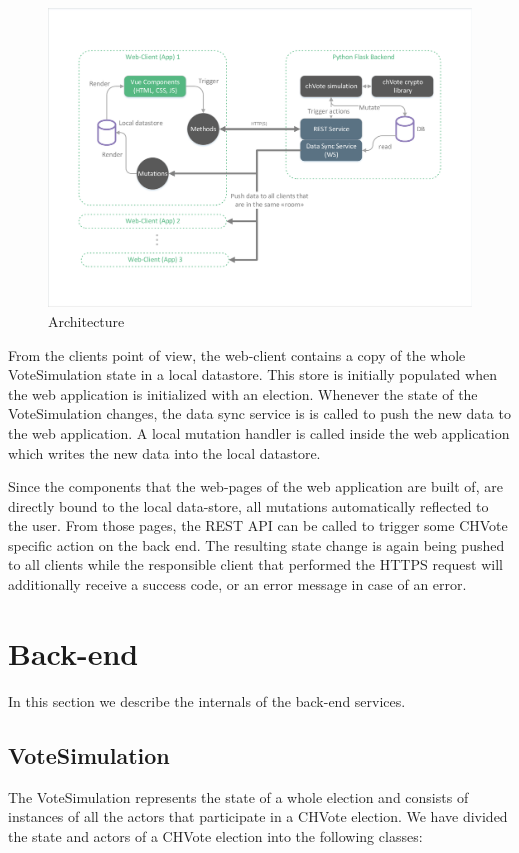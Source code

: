 \begin{figure}[h!]
\begin{center}
\includegraphics[scale=0.62]{assets/architecture.pdf}
\caption{Architecture}
\end{center}
\end{figure}

From the clients point of view, the web-client contains a copy of the whole VoteSimulation state in a local datastore. This store is initially populated when the web application is initialized with an election. Whenever the state of the VoteSimulation changes, the data sync service is is called to push the new data to the web application. A local mutation handler is called inside the web application which writes the new data into the local datastore.

Since the components that the web-pages of the web application are built of, are directly bound to the local data-store, all mutations automatically reflected to the user. From those pages, the REST API can be called to trigger some CHVote specific action on the back end. The resulting state change is again being pushed to all clients while the responsible client that performed the HTTPS request will additionally receive a success code, or an error message in case of an error.

\section{Back-end}
In this section we describe the internals of the back-end services. 
\subsection{VoteSimulation}
The VoteSimulation represents the state of a whole election and consists of instances of all the actors that participate in a CHVote election. We have divided the state and actors of a CHVote election into the following classes:

